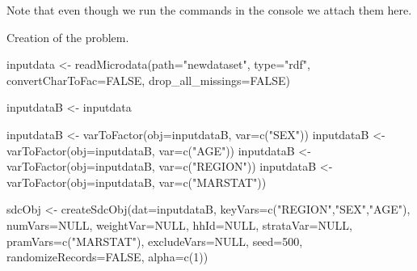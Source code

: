 \documentclass[
]{article}
\newenvironment{Shaded}{\begin{snugshade}}{\end{snugshade}}
\newcommand{\AttributeTok}[1]{\textcolor[rgb]{0.77,0.63,0.00}{#1}}
\newcommand{\ConstantTok}[1]{\textcolor[rgb]{0.00,0.00,0.00}{#1}}
\newcommand{\DecValTok}[1]{\textcolor[rgb]{0.00,0.00,0.81}{#1}}
\newcommand{\FunctionTok}[1]{\textcolor[rgb]{0.00,0.00,0.00}{#1}}
\newcommand{\NormalTok}[1]{#1}
\newcommand{\OtherTok}[1]{\textcolor[rgb]{0.56,0.35,0.01}{#1}}
\newcommand{\StringTok}[1]{\textcolor[rgb]{0.31,0.60,0.02}{#1}}
\begin{document}
Note that even though we run the commands in the console we attach them
here.

Creation of the problem.

\begin{Shaded}
\begin{Highlighting}[]
\NormalTok{inputdata }\OtherTok{\textless{}{-}} \FunctionTok{readMicrodata}\NormalTok{(}\AttributeTok{path=}\StringTok{"newdataset"}\NormalTok{, }\AttributeTok{type=}\StringTok{"rdf"}\NormalTok{, }\AttributeTok{convertCharToFac=}\ConstantTok{FALSE}\NormalTok{, }\AttributeTok{drop\_all\_missings=}\ConstantTok{FALSE}\NormalTok{)}

\NormalTok{inputdataB }\OtherTok{\textless{}{-}}\NormalTok{ inputdata}

\NormalTok{inputdataB }\OtherTok{\textless{}{-}} \FunctionTok{varToFactor}\NormalTok{(}\AttributeTok{obj=}\NormalTok{inputdataB, }\AttributeTok{var=}\FunctionTok{c}\NormalTok{(}\StringTok{"SEX"}\NormalTok{)) }
\NormalTok{inputdataB }\OtherTok{\textless{}{-}} \FunctionTok{varToFactor}\NormalTok{(}\AttributeTok{obj=}\NormalTok{inputdataB, }\AttributeTok{var=}\FunctionTok{c}\NormalTok{(}\StringTok{"AGE"}\NormalTok{)) }
\NormalTok{inputdataB }\OtherTok{\textless{}{-}} \FunctionTok{varToFactor}\NormalTok{(}\AttributeTok{obj=}\NormalTok{inputdataB, }\AttributeTok{var=}\FunctionTok{c}\NormalTok{(}\StringTok{"REGION"}\NormalTok{)) }
\NormalTok{inputdataB }\OtherTok{\textless{}{-}} \FunctionTok{varToFactor}\NormalTok{(}\AttributeTok{obj=}\NormalTok{inputdataB, }\AttributeTok{var=}\FunctionTok{c}\NormalTok{(}\StringTok{"MARSTAT"}\NormalTok{))}

\NormalTok{sdcObj }\OtherTok{\textless{}{-}} \FunctionTok{createSdcObj}\NormalTok{(}\AttributeTok{dat=}\NormalTok{inputdataB, }
                       \AttributeTok{keyVars=}\FunctionTok{c}\NormalTok{(}\StringTok{"REGION"}\NormalTok{,}\StringTok{"SEX"}\NormalTok{,}\StringTok{"AGE"}\NormalTok{),  }
                       \AttributeTok{numVars=}\ConstantTok{NULL}\NormalTok{,  }
                       \AttributeTok{weightVar=}\ConstantTok{NULL}\NormalTok{,  }
                       \AttributeTok{hhId=}\ConstantTok{NULL}\NormalTok{,  }
                       \AttributeTok{strataVar=}\ConstantTok{NULL}\NormalTok{,  }
                       \AttributeTok{pramVars=}\FunctionTok{c}\NormalTok{(}\StringTok{"MARSTAT"}\NormalTok{),  }
                       \AttributeTok{excludeVars=}\ConstantTok{NULL}\NormalTok{,  }
                       \AttributeTok{seed=}\DecValTok{500}\NormalTok{,  }
                       \AttributeTok{randomizeRecords=}\ConstantTok{FALSE}\NormalTok{,  }
                       \AttributeTok{alpha=}\FunctionTok{c}\NormalTok{(}\DecValTok{1}\NormalTok{))}
\end{Highlighting}
\end{Shaded}
\end{document}
